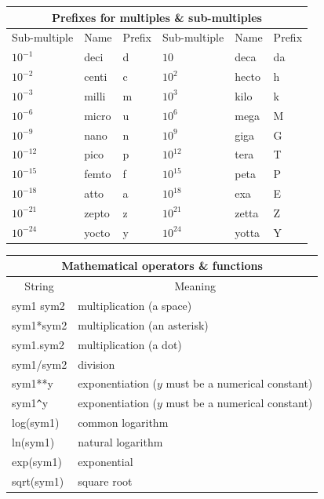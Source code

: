 \documentclass[twoside,11pt]{starlink}
\begin{document}
\begin{table}[htbp]
\begin{center}
\begin{tabular}{|lll|lll|}
\hline
\multicolumn{6}{|c|}{{\large Prefixes for multiples \&
sub-multiples}} \\ \hline
\multicolumn{1}{|c}{Sub-multiple} & \multicolumn{1}{c}{Name} &
\multicolumn{1}{c|}{Prefix} &
\multicolumn{1}{|c}{Sub-multiple} & \multicolumn{1}{c}{Name} &
\multicolumn{1}{c|}{Prefix} \\ \hline
$10^{-1}$ & deci & d & $10$ & deca & da \\
$10^{-2}$ & centi & c & $10^{2}$ & hecto & h \\
$10^{-3}$ & milli & m & $10^{3}$ & kilo & k \\
$10^{-6}$ & micro & u & $10^{6}$ & mega & M \\
$10^{-9}$ & nano & n & $10^{9}$ & giga & G \\
$10^{-12}$ & pico & p & $10^{12}$ & tera & T \\
$10^{-15}$ & femto & f & $10^{15}$ & peta & P \\
$10^{-18}$ & atto & a & $10^{18}$ & exa & E \\
$10^{-21}$ & zepto & z & $10^{21}$ & zetta & Z \\
$10^{-24}$ & yocto & y & $10^{24}$ & yotta & Y \\
\hline
\end{tabular}
\end{center}
\end{table}

\begin{table}[htbp]
\begin{center}
\begin{tabular}{|l|l|}
\hline
\multicolumn{2}{|c|}{{\large Mathematical operators \& functions}} \\
\hline
\multicolumn{1}{|c|}{String} & \multicolumn{1}{|c|}{Meaning} \\ \hline
sym1 sym2           & multiplication (a space) \\
sym1*sym2           & multiplication (an asterisk) \\
sym1.sym2           & multiplication (a dot) \\
sym1/sym2           & division \\
sym1**y             & exponentiation ($y$ must be a numerical constant)\\
sym1\verb+^+y       & exponentiation ($y$ must be a numerical constant)\\
log(sym1)           & common logarithm \\
ln(sym1)            & natural logarithm \\
exp(sym1)           & exponential \\
sqrt(sym1)          & square root \\
\hline
\end{tabular}
\end{center}
\end{table}
\end{document}
